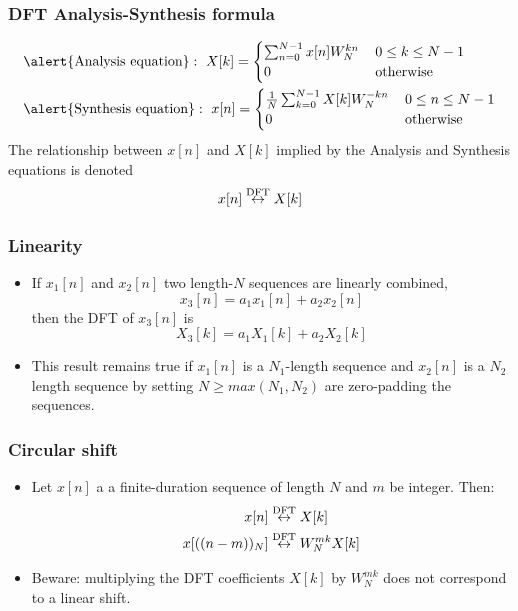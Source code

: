\begin{frame}
\frametitle{DFT Analysis-Synthesis formula}
\begin{align*}
&\alert{\text{Analysis\ equation}}:\ X[k]=
\begin{cases} \sum_{n=0}^{N-1}x[n]W_{N}^{kn} \, & 0 \leq k \leq N-1 \\ 0 & \text{otherwise} \end{cases}\\
&\alert{\text{Synthesis\ equation}}:\
x[n]= \begin{cases} \frac{1}{N}\sum_{k=0}^{N-1}X[k]W_{N}^{-kn} \, & 0 \leq n \leq N-1 \\ 0 & \text{otherwise} \end{cases}
\end{align*}
The relationship between $x[n]$ and $X[k]$ implied by the Analysis and Synthesis equations is denoted
\alert{
$$
x[n] \stackrel{\mathrm{DFT}}{\leftrightarrow} X[k]
$$
}
\end{frame}

\begin{frame}
\frametitle{Linearity}
\begin{itemize}
\item If $x_1[n]$ and $x_2[n]$ two length-$N$ sequences are linearly combined, \ie\, 
\[
x_3[n]= a_1 x_1[n] + a_2 x_2[n]
\]
then the DFT of $x_3[n]$ is
\[
X_3[k]= a_1 X_1[k] + a_2 X_2[k]
\]
\item This result remains true if $x_1[n]$ is a $N_1$-length sequence and $x_2[n]$ is a $N_2$ length sequence by setting $N \geq max(N_1,N_2)$
are zero-padding the sequences.
\end{itemize} 
\end{frame}


\begin{frame}
\frametitle{Circular shift}
\begin{itemize}
\item Let $x[n]$ a a finite-duration sequence of length $N$ and $m$ be integer. Then:
\begin{align*}
x[n] &\stackrel{\mathrm{DFT}}{\leftrightarrow} X[k]  \\
x[((n-m))_N] & \stackrel{\mathrm{DFT}}{\leftrightarrow} W_N^{mk} X[k]
\end{align*}
\item \alert{Beware}: multiplying the DFT coefficients $X[k]$ by $W_N^{mk}$ \alert{does not correspond} to a \alert{linear} shift.
\end{itemize}
\end{frame}

